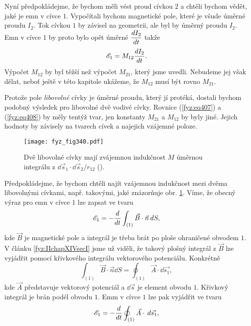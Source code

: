 {  Nyní předpokládejme, že bychom měli vést proud cívkou \(2\) a chtěli bychom vědět, jaké je emn v 
  cívce \(1\). Vypočítali bychom magnetické pole, které je všude úměrné proudu \(I_2\). Tok cívkou 
  \(1\) by závisel na geometrii, ale byl by úměrný proudu \(I_2\). Emn v cívce \(1\) by proto bylo 
  opět úměrné \(\dfrac{d I_2}{d t}\) takže
  \begin{equation}\label{fyz:eq408}
    \mathscr{E}_1 = M_{12}\dfrac{d I_2}{d t}.
  \end{equation}
  Výpočet \(M_{12}\) by byl těžší než výpočet \(M_{21}\), který jsme uvedli. Nebudeme jej však 
  dělat, neboť ještě v této kapitole ukážeme, že \(M_{12}\) musí být rovno \(M_{21}\).
  
  Protože pole \emph{libovolné} cívky je úměrné proudu, který jí protéká, dostali bychom podobný 
  výsledek pro libovolné dvě vodivé cívky. Rovnice (\ref{fyz:eq407}) a (\ref{fyz:eq408}) by měly 
  tentýž tvar, jen konstanty \(M_{21}\) a \(M_{12}\) by byly jiné. Jejich hodnoty by závisely na 
  tvarech cívek a najejich vzájemné poloze.
  
  \begin{figure}[ht!]  %
    \centering
    \texttt{[image: fyz\_fig340.pdf]}
    \caption{Dvě libovolné cívky mají zvájemnou indukčnost \(M\) úměrnou integrálu z 
            \(\dd{\vec{s}_1}\cdot\dd{\vec{s}_2}/r_{12}\)
             (\cite[s.~305]{Feynman02}).}
    \label{fyz:fig340}
  \end{figure}

  Předpokládejme, že bychom chtěli najít vzájemnou indukčnost mezi dvěma libovolnými cívkami, např. 
  takovými, jaké znázorňuje obr. \ref{fyz:fig340}. Víme, že obecný výraz pro emn v 
  cívce \(1\) lze zapsat ve tvaru
  \begin{equation}\label{fyz:eq409}
    \mathscr{E}_1 = - \dfrac{d  }{d t}\int_{(1)}\vec{B}\cdot\vec{n}\hspace{2pt}dS,
  \end{equation}
  kde \(\vec{B}\) je magnetické pole a integrál je třeba brát po ploše ohraničené obvodem \(1\). 
  V článku \ref{fyz:IIchapXIVsecI} jsme už viděli, že takový plošný integrál z \(\vec{B}\) lze 
  vyjádřit pomocí křivkového integrálu vektorového potenciálu. Konkrétně
  \begin{equation}\label{fyz:eq410}
    \int_{(1)}\vec{B}\cdot\vec{n}\dd{S} = \oint_{(1)}\vec{A}\cdot\dd{\vec{s_1}},
  \end{equation}
  kde \(\vec{A}\) představuje vektorový potenciál a \(\dd{\vec{s}}\) je element obvodu \(1\). 
  Křivkový integrál je brán podél obvodu \(1\). Emm v cívce \(1\) lze pak vyjádřit ve tvaru
  \begin{equation}\label{fyz:eq411}
    \mathscr{E}_1 = -\dfrac{d  }{d t}\oint_{(1)}\vec{A}\cdot\hspace{2pt}d\vec{s_1},
  \end{equation}
  
}
